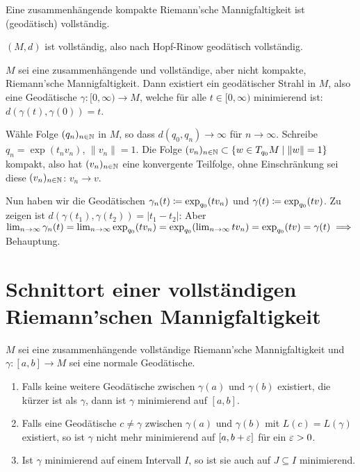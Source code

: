 \documentclass[a4paper,twoside,DIV15,BCOR12mm]{scrbook}
\begin{document}
\begin{korrolar}
Eine zusammenhängende kompakte Riemann’sche Mannigfaltigkeit ist (geodätisch) vollständig.
\end{korrolar}

\begin{beweis}
$(M,d)$ ist vollständig, also nach Hopf-Rinow geodätisch vollständig.
\end{beweis}

\begin{korrolar}
$M$ sei eine zusammenhängende und vollständige, aber nicht kompakte, Riemann’sche Mannigfaltigkeit. Dann existiert ein geodätischer Strahl in $M$, also eine Geodätische $\gamma:[0,\infty)\to M$, welche für alle $t\in [0,\infty)$ minimierend ist: $d(\gamma(t),\gamma(0)) = t$.
\end{korrolar}

\begin{beweis}
Wähle Folge $(q_n)_{n\in\mathbb{N}}$ in $M$, so dass $d(q_0,q_n)\to \infty$ für $n\to\infty$. Schreibe $q_n = \exp(t_n v_n)$, $\|v_n\|=1$. Die Folge $(v_n)_{n\in\mathbb{N}} \subset \{ w \in T_{q_0}M\mid \|w\|=1\}$ kompakt, also hat $(v_n)_{n\in\mathbb{N}}$ eine konvergente Teilfolge, ohne Einschränkung sei diese $(v_n)_{n\in \mathbb{N}}$: $v_n \to v$.

Nun haben wir die Geodätischen $\gamma_n(t) \da \exp_{q_0}(tv_n)$ und  $\gamma(t) \da \exp_{q_0}(tv)$. Zu zeigen ist $d(\gamma(t_1), \gamma(t_2)) = |t_1 - t_2|$: Aber $\lim_{n\to\infty} \gamma_n(t) = \lim_{n\to\infty} \exp_{q_0}(tv_n) = \exp_{q_0}(\lim_{n\to\infty}tv_n) = \exp_{q_0}(tv) = \gamma(t) \implies$ Behauptung.
\end{beweis}

\section{Schnittort einer vollständigen Riemann’schen Mannigfaltigkeit}
\label{schnittort}

\begin{lemma}
$M$ sei eine zusammenhängende vollständige Riemann’sche Mannigfaltigkeit und $\gamma:[a,b]\to M$ sei eine normale Geodätische.

\begin{enumerate}
\item Falls keine weitere Geodätische zwischen $\gamma(a)$ und $\gamma(b)$ existiert, die kürzer ist als $\gamma$, dann ist $\gamma$ minimierend auf $[a,b]$.
\item Falls eine Geodätische $c\ne \gamma$ zwischen $\gamma(a)$ und $\gamma(b)$ mit $L(c)=L(\gamma)$ existiert, so ist $\gamma$ nicht mehr minimierend auf $[a,b+\varepsilon]$ für ein $\varepsilon >0$.
\item Ist $\gamma$ minimierend auf einem Intervall $I$, so ist sie auch auf $J\subseteq I$ minimierend.
\end{enumerate}
\end{lemma}
\end{document}
